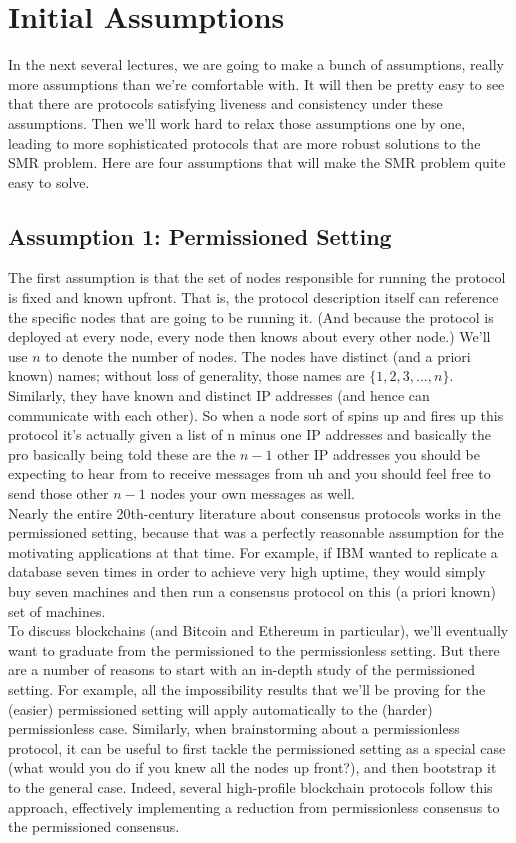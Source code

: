 \section{Initial Assumptions}
In the next several lectures, we are going to make a bunch of assumptions, really more assumptions than we’re
comfortable with. It will then be pretty easy to see that there are protocols satisfying liveness
and consistency under these assumptions. Then we’ll work hard to relax those assumptions
one by one, leading to more sophisticated protocols that are more robust solutions to the
SMR problem. Here are four assumptions that will make the SMR problem quite easy to
solve.

\subsection{Assumption 1: Permissioned Setting}
The first assumption is that the set of nodes responsible for running the protocol is fixed
and known upfront. That is, the protocol description itself can reference the specific nodes
that are going to be running it. (And because the protocol is deployed at every node, every
node then knows about every other node.) We’ll use $n$ to denote the number of nodes. The
nodes have distinct (and a priori known) names; without loss of generality, those names
are $\{1, 2, 3, . . . , n\}$. Similarly, they have known and distinct IP addresses (and hence can
communicate with each other). So when a node sort of
spins up and fires up this protocol it's
actually given a list of n minus one IP
addresses and basically the pro
basically being told these are the $n-1$ other IP addresses you should
be expecting to hear from to receive
messages from uh and you should feel
free to send those other $n-1$
nodes your own messages as well.\\
Nearly the entire 20th-century literature about consensus protocols works in the permissioned setting, because that was a perfectly reasonable assumption for the motivating
applications at that time. For example, if IBM wanted to replicate a database seven times
in order to achieve very high uptime, they would simply buy seven machines and then run
a consensus protocol on this (a priori known) set of machines.\\
To discuss blockchains (and Bitcoin and Ethereum in particular), we’ll eventually want
to graduate from the permissioned to the permissionless setting. But there are a number of
reasons to start with an in-depth study of the permissioned setting. For example, all the
impossibility results that we’ll be proving for the (easier) permissioned setting will apply
automatically to the (harder) permissionless case. Similarly, when brainstorming about a
permissionless protocol, it can be useful to first tackle the permissioned setting as a special case (what would you do if you knew all the nodes up front?), and then bootstrap it
to the general case. Indeed, several high-profile blockchain protocols follow this approach,
effectively implementing a reduction from permissionless consensus to the permissioned consensus.

